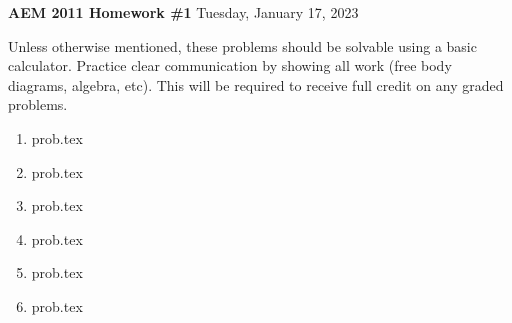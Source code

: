 \documentclass{article}
\begin{document}

\vspace{1cm}

\noindent
\textbf{AEM 2011 Homework \#1}
\hfill Tuesday, January 17, 2023

\vspace{.3cm}

Unless otherwise mentioned, these problems should be solvable using a basic calculator. Practice clear communication by showing all work (free body diagrams, algebra, etc).  This will be required to receive full credit on any graded problems.

\noindent
\begin{enumerate}
  \item {prob.tex} \newpage
  \item {prob.tex} \newpage
  \item {prob.tex} \newpage
  \item {prob.tex} \newpage
  \item {prob.tex} \newpage
  \item {prob.tex} \newpage
\end{enumerate}
\end{document}
